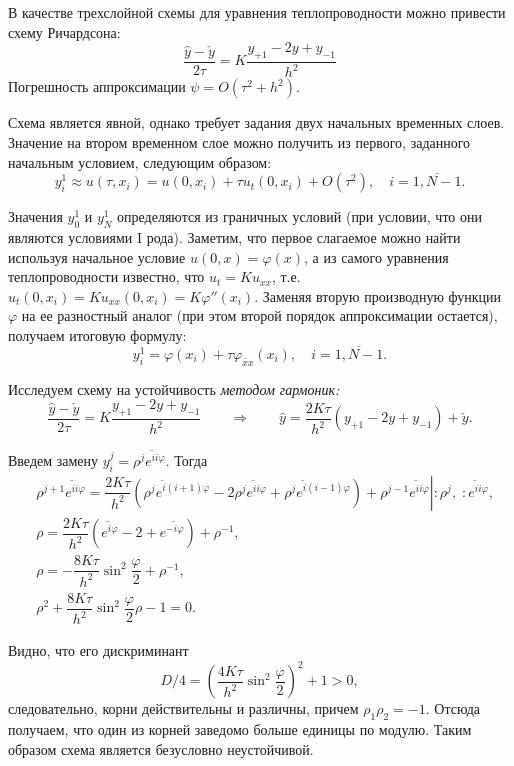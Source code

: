 \documentclass[12pt, a4paper]{article}
\begin{document}
\begin{enumerate}
		В качестве трехслойной схемы для уравнения теплопроводности можно привести схему Ричардсона:
		\[
		\frac{\hat y - \check y}{2\tau}=K\frac{y_{+1}-2y+y_{-1}}{h^2}
		\]
		Погрешность аппроксимации $\psi=O(\tau^2+h^2)$.
		
		Схема является явной, однако требует задания двух начальных временных слоев. Значение на втором временном слое можно получить из первого, заданного начальным условием, следующим образом:
		\[
		y_i^1 \approx u(\tau, x_i) = u(0, x_i) + \tau u_t(0, x_i) + O(\tau^2), \quad i = \overline{1, N-1}.
		\]
		
		Значения $y_0^1$ и $y_N^1$ определяются из граничных условий (при условии, что они являются условиями I рода). Заметим, что первое слагаемое можно найти используя начальное условие $u(0, x) = \varphi(x)$, а из самого уравнения теплопроводности известно, что $u_t = K u_{xx}$, т.е. $u_t(0, x_i) = K u_{xx}(0, x_i) = K \varphi''(x_i)$. Заменяя вторую производную функции $\varphi$ на ее разностный аналог (при этом второй порядок аппроксимации остается), получаем итоговую формулу:
		\[
		y_i^1 = \varphi(x_i) + \tau \varphi_{\bar{x}x}(x_i), \quad i = \overline{1, N-1}.
		\]
		
		Исследуем схему на устойчивость \textit{методом гармоник:}
		\[
		\frac{\hat y - \check y}{2\tau}=K\frac{y_{+1}-2y+y_{-1}}{h^2}\qquad \Rightarrow \qquad \hat y = \frac{2 K\tau}{h^2}(y_{+1}-2y+y_{-1}) + \check y.
		\]
		
		Введем замену $y_i^j=\rho^je^{\tilde i i \varphi}$. Тогда
		\begin{eqnarray*}
			& \rho^{j+1}e^{\tilde i i \varphi} = \dfrac{2 K\tau}{h^2}(\rho^je^{\tilde i (i+1) \varphi}-2\rho^je^{\tilde i i \varphi}+\rho^je^{\tilde i (i-1) \varphi}) + \rho^{j-1}e^{\tilde i i \varphi} \left.\right|:\rho^{j},\;:e^{\tilde i i \varphi},\\
			& \rho=\dfrac{2K\tau}{h^2}(e^{\tilde i \varphi}-2+e^{-\tilde i \varphi})+\rho^{-1}, \\
			& \rho=-\dfrac{8K\tau}{h^2}\sin^2\dfrac{\varphi}{2}+\rho^{-1},\\
			& \rho^2+\dfrac{8K\tau}{h^2}\sin^2\dfrac{\varphi}{2}\rho-1=0.
		\end{eqnarray*}
		
		Видно, что его дискриминант
		\[
		D/4 = \left(\frac{4K\tau}{h^2} \sin^2 \frac\varphi2\right)^2 + 1 > 0,
		\]
		следовательно, корни действительны и различны, причем $\rho_1 \rho_2 = -1$. Отсюда получаем, что один из корней заведомо больше единицы по модулю. Таким образом схема является безусловно неустойчивой.
		

\end{enumerate}
\end{document}

